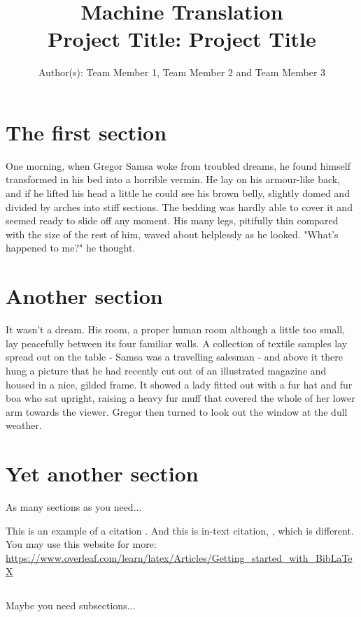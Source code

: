 \documentclass[11pt]{article}
\title{{\LARGE Machine Translation}\\[1.5mm]
{\large Project Title: Project Title}\\[1.5mm]} %
\author{Author(s): Team Member 1, Team Member 2 and Team Member 3}%
\date{} %
\begin{document}
\maketitle


\section{The first section}

One morning, when Gregor Samsa woke from troubled dreams, he found himself
transformed in his bed into a horrible vermin. He lay on his armour-like back,
and if he lifted his head a little he could see his brown belly, slightly domed
and divided by arches into stiff sections. The bedding was hardly able to cover
it and seemed ready to slide off any moment. His many legs, pitifully thin
compared with the size of the rest of him, waved about helplessly as he looked.
"What's happened to me?" he thought. 


\section{Another section} It wasn't a dream. His room, a proper human room
although a little too small, lay peacefully between its four familiar walls. A
collection of textile samples lay spread out on the table - Samsa was a
travelling salesman - and above it there hung a picture that he had recently cut
out of an illustrated magazine and housed in a nice, gilded frame. It showed a
lady fitted out with a fur hat and fur boa who sat upright, raising a heavy fur
muff that covered the whole of her lower arm towards the viewer. Gregor then
turned to look out the window at the dull weather. 

\section{Yet another section}

As many sections as you need... 

This is an example of a citation \parencite{raghunathan-etal-2010-multi}. And
this is in-text citation,  \cite{raghunathan-etal-2010-multi}, which is
different. You may use this website for more:
\url{https://www.overleaf.com/learn/latex/Articles/Getting_started_with_BibLaTeX}


\subsection{}

Maybe you need subsections... 

\printbibliography
\end{document}
